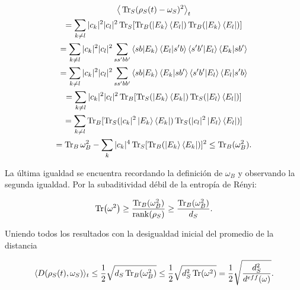 \begin{multline}
\big \langle \Tr_{S}(\rho_{S}(t)-\omega_{S})^{2} \big \rangle_{t}\\
	= \sum_{k \neq l} |c_{k}|^{2} |c_{l}|^{2} \Tr_{S} [\Tr_{B}(\ket{E_{k}} \bra{E_{l}}) \Tr_{B}(\ket{E_{k}} \bra{E_{l}})]\\
	=\sum_{k \neq l} |c_{k}|^{2} |c_{l}|^{2} \sum_{ss' bb'} \bra{sb}\ket{E_{k}} \bra{E_{l}}\ket{s'b} \bra{s'b'}\ket{E_{l}} \bra{E_{k}}\ket{sb'}\\
	=\sum_{k \neq l} |c_{k}|^{2} |c_{l}|^{2} \sum_{ss' bb'} \bra{sb}\ket{E_{k}} \bra{E_{k}}\ket{sb'} \bra{s'b'}\ket{E_{l}} \bra{E_{l}}\ket{s'b}\\
	=\sum_{k \neq l} |c_{k}|^{2} |c_{l}|^{2} \Tr_{B} [\Tr_{S}(\ket{E_{k}} \bra{E_{k}}) \Tr_{S}(\ket{E_{l}} \bra{E_{l}})]\\
	=\sum_{k \neq l}  \Tr_{B} [\Tr_{S}(|c_{k}|^{2}\ket{E_{k}} \bra{E_{k}}) \Tr_{S}( |c_{l}|^{2} \ket{E_{l}} \bra{E_{l}})]\\
=\Tr_{B} \omega_{B}^{2} -\sum_{k} |c_{k}|^{4} \Tr_{S}[ \Tr_{B}( \ket{E_{k}} \bra{E_{k}})]^{2} \leq  \Tr_{B}( \omega_{B}^{2}).
\end{multline}

La última  igualdad se encuentra recordando la definición de $\omega_{B}$ y observando la segunda igualdad. Por la subaditividad débil de la entropía de Rényi:

\begin{equation}
\Tr(\omega^{2}) \geq  \frac{\Tr_{B}(\omega_{B}^{2})}{ \rank (\rho_{S})} \geq \frac{\Tr_{B}(\omega_{B}^{2})}{d_{S}}.
\end{equation}

Uniendo todos los resultados con la desigualdad inicial del promedio de la distancia

\begin{equation}
\langle D(\rho_{S}(t) ,\omega_{S}) \rangle_{t} \le  \frac{1}{2} \sqrt{d_{S} \Tr_{B}(\omega_{B}^{2})} \le \frac{1}{2}\sqrt{d_{S}^{2} 	\Tr(\omega^{2})}=\frac{1}{2}\sqrt{\frac{d_{S}^{2}}{d^{eff}(\omega)}}.
\end{equation}


